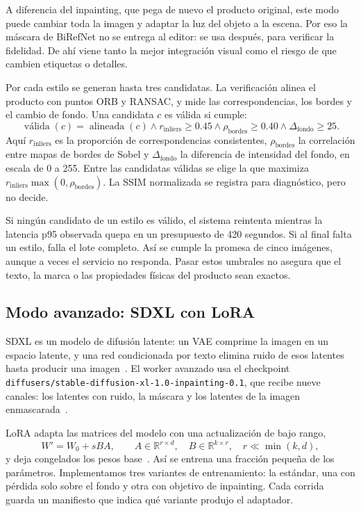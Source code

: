\documentclass[11pt,a4paper]{article}
\begin{document}
A diferencia del inpainting, que pega de nuevo el producto original, este modo puede cambiar toda la imagen y adaptar la luz del objeto a la escena. Por eso la máscara de BiRefNet no se entrega al editor: se usa después, para verificar la fidelidad. De ahí viene tanto la mejor integración visual como el riesgo de que cambien etiquetas o detalles.

Por cada estilo se generan hasta tres candidatas. La verificación alinea el producto con puntos ORB y RANSAC, y mide las correspondencias, los bordes y el cambio de fondo. Una candidata $c$ es válida si cumple:
\[
\operatorname{válida}(c)=\operatorname{alineada}(c)\land
r_{\mathrm{inliers}}\geq0.45\land\rho_{\mathrm{bordes}}\geq0.40
\land\Delta_{\mathrm{fondo}}\geq25.
\]
Aquí $r_{\mathrm{inliers}}$ es la proporción de correspondencias consistentes, $\rho_{\mathrm{bordes}}$ la correlación entre mapas de bordes de Sobel y $\Delta_{\mathrm{fondo}}$ la diferencia de intensidad del fondo, en escala de 0 a 255. Entre las candidatas válidas se elige la que maximiza $r_{\mathrm{inliers}}\max(0,\rho_{\mathrm{bordes}})$. La SSIM normalizada se registra para diagnóstico, pero no decide.

Si ningún candidato de un estilo es válido, el sistema reintenta mientras la latencia p95 observada quepa en un presupuesto de 420 segundos. Si al final falta un estilo, falla el lote completo. Así se cumple la promesa de cinco imágenes, aunque a veces el servicio no responda. Pasar estos umbrales no asegura que el texto, la marca o las propiedades físicas del producto sean exactos.

\subsection{Modo avanzado: SDXL con LoRA}
SDXL es un modelo de difusión latente: un VAE comprime la imagen en un espacio latente, y una red condicionada por texto elimina ruido de esos latentes hasta producir una imagen~\cite{sdxl}. El worker avanzado usa el checkpoint \texttt{diffusers/stable-diffusion-xl-1.0-inpainting-0.1}, que recibe nueve canales: los latentes con ruido, la máscara y los latentes de la imagen enmascarada~\cite{inpaint}.

LoRA adapta las matrices del modelo con una actualización de bajo rango,
\[
W'=W_0+sBA,\qquad A\in\mathbb{R}^{r\times d},\quad
B\in\mathbb{R}^{k\times r},\quad r\ll\min(k,d),
\]
y deja congelados los pesos base~\cite{lora}. Así se entrena una fracción pequeña de los parámetros. Implementamos tres variantes de entrenamiento: la estándar, una con pérdida solo sobre el fondo y otra con objetivo de inpainting. Cada corrida guarda un manifiesto que indica qué variante produjo el adaptador.
\end{document}
